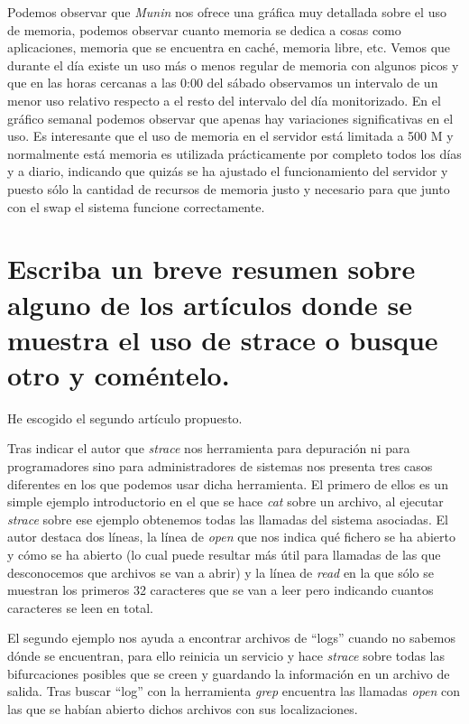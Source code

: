 Podemos observar que \textit{Munin} nos ofrece una gráfica muy detallada sobre el uso de memoria, podemos observar cuanto memoria se dedica a cosas como aplicaciones, memoria que se encuentra en caché, memoria libre, etc. Vemos que durante el día existe un uso más o menos regular de memoria con algunos picos y que en las horas cercanas a las 0:00 del sábado observamos un intervalo de un menor uso relativo respecto a el resto del intervalo del día monitorizado. En el gráfico semanal podemos observar que apenas hay variaciones significativas en el uso. Es interesante que el uso de memoria en el servidor está limitada a 500 M y normalmente está memoria es utilizada prácticamente por completo todos los días y a diario, indicando que quizás se ha ajustado el funcionamiento del servidor y puesto sólo la cantidad de recursos de memoria justo y necesario para que junto con el swap el sistema funcione correctamente.

\section{Escriba un breve resumen sobre alguno de los artículos donde se muestra el uso de strace o busque otro y coméntelo.}
He escogido el segundo artículo propuesto.\cite{c7a} \linebreak\linebreak

Tras indicar el autor que \textit{strace} nos herramienta para depuración ni para programadores sino para administradores de sistemas nos presenta tres casos diferentes en los que podemos usar dicha herramienta. El primero de ellos es un simple ejemplo introductorio en el que se hace \textit{cat} sobre un archivo, al ejecutar \textit{strace} sobre ese ejemplo obtenemos todas las llamadas del sistema asociadas. El autor destaca dos líneas, la línea de \textit{open} que nos indica qué fichero se ha abierto y cómo se ha abierto (lo cual puede resultar más útil para llamadas de las que desconocemos que archivos se van a abrir) y la línea de \textit{read} en la que sólo se muestran los primeros 32 caracteres que se van a leer pero indicando cuantos caracteres se leen en total.\linebreak 

El segundo ejemplo nos ayuda a encontrar archivos de ``logs'' cuando no sabemos dónde se encuentran, para ello reinicia un servicio y hace \textit{strace} sobre todas las bifurcaciones posibles que se creen y guardando la información en un archivo de salida. Tras buscar ``log'' con la herramienta \textit{grep} encuentra las llamadas \textit{open} con las que se habían abierto dichos archivos con sus localizaciones. \linebreak 

